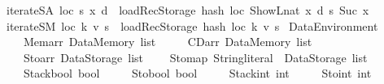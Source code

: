 \begin{isabellebody}
{\isacharbar}{\kern0pt}\ {\isachardoublequoteopen}iterateSA\ loc\ {\isacharparenleft}{\kern0pt}s{\isacharprime}{\kern0pt}{\isacharcomma}{\kern0pt}\ x{\isacharparenright}{\kern0pt}\ d\ {\isacharequal}{\kern0pt}\ {\isacharparenleft}{\kern0pt}loadRec\isactrlsub S\isactrlsub t\isactrlsub o\isactrlsub r\isactrlsub a\isactrlsub g\isactrlsub e\ {\isacharparenleft}{\kern0pt}hash\ loc\ {\isacharparenleft}{\kern0pt}ShowL\isactrlsub n\isactrlsub a\isactrlsub t\ x{\isacharparenright}{\kern0pt}{\isacharparenright}{\kern0pt}\ d\ s{\isacharprime}{\kern0pt}{\isacharcomma}{\kern0pt}\ Suc\ x{\isacharparenright}{\kern0pt}{\isachardoublequoteclose}\isanewline
{\isacharbar}{\kern0pt}\ {\isachardoublequoteopen}iterateSM\ loc\ {\isacharparenleft}{\kern0pt}k{\isacharcomma}{\kern0pt}\ v{\isacharparenright}{\kern0pt}\ s{\isacharprime}{\kern0pt}\ {\isacharequal}{\kern0pt}\ loadRec\isactrlsub S\isactrlsub t\isactrlsub o\isactrlsub r\isactrlsub a\isactrlsub g\isactrlsub e\ {\isacharparenleft}{\kern0pt}hash\ loc\ k{\isacharparenright}{\kern0pt}\ v\ s{\isacharprime}{\kern0pt}{\isachardoublequoteclose}%
\isadelimdocument
%
\endisadelimdocument
%
\isatagdocument
%
\isamarkuptrue%
%
\endisatagdocument
{\isafolddocument}%
%
\isadelimdocument
%
\endisadelimdocument
{}\isamarkupfalse%
\ Data\isactrlsub E\isactrlsub n\isactrlsub v\isactrlsub i\isactrlsub r\isactrlsub o\isactrlsub n\isactrlsub m\isactrlsub e\isactrlsub n\isactrlsub t\ {\isacharequal}{\kern0pt}\isanewline
\ \ \ \ Memarr\ {\isachardoublequoteopen}Data\isactrlsub M\isactrlsub e\isactrlsub m\isactrlsub o\isactrlsub r\isactrlsub y\ list{\isachardoublequoteclose}\ {\isacharbar}{\kern0pt}\isanewline
\ \ \ \ CDarr\ {\isachardoublequoteopen}Data\isactrlsub M\isactrlsub e\isactrlsub m\isactrlsub o\isactrlsub r\isactrlsub y\ list{\isachardoublequoteclose}\ {\isacharbar}{\kern0pt}\isanewline
\ \ \ \ Stoarr\ {\isachardoublequoteopen}Data\isactrlsub S\isactrlsub t\isactrlsub o\isactrlsub r\isactrlsub a\isactrlsub g\isactrlsub e\ list{\isachardoublequoteclose}{\isacharbar}{\kern0pt}\isanewline
\ \ \ \ Stomap\ {\isachardoublequoteopen}{\isacharparenleft}{\kern0pt}String{\isachardot}{\kern0pt}literal\ {\isasymtimes}\ Data\isactrlsub S\isactrlsub t\isactrlsub o\isactrlsub r\isactrlsub a\isactrlsub g\isactrlsub e{\isacharparenright}{\kern0pt}\ list{\isachardoublequoteclose}\ {\isacharbar}{\kern0pt}\isanewline
\ \ \ \ Stackbool\ bool\ {\isacharbar}{\kern0pt}\isanewline
\ \ \ \ Stobool\ bool\ {\isacharbar}{\kern0pt}\isanewline
\ \ \ \ Stackint\ int\ {\isacharbar}{\kern0pt}\isanewline
\ \ \ \ Stoint\ int\ {\isacharbar}{\kern0pt}\isanewline

\end{isabellebody}
